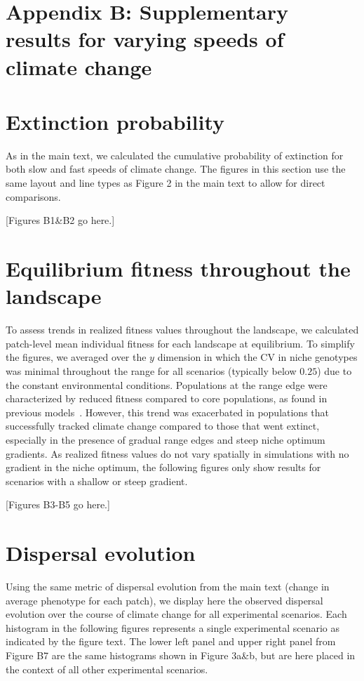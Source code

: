 \documentclass[11pt]{article}
\begin{document}
\section*{Appendix B: Supplementary results for varying speeds of climate change}

\renewcommand{\theequation}{B\arabic{equation}}
\renewcommand{\thetable}{B\arabic{table}}
\setcounter{equation}{0}  %
\setcounter{figure}{0}
\setcounter{table}{0}

\section*{Extinction probability}
As in the main text, we calculated the cumulative probability of extinction for both slow and fast speeds of climate change. The figures in this section use the same layout and line types as Figure 2 in the main text to allow for direct comparisons.

[Figures B1\&B2 go here.]

\section*{Equilibrium fitness throughout the landscape}
To assess trends in realized fitness values throughout the landscape, we calculated patch-level mean individual fitness for each landscape at equilibrium. To simplify the figures, we averaged over the $y$ dimension in which the CV in niche genotypes was minimal throughout the range for all scenarios (typically below $0.25$) due to the constant environmental conditions. Populations at the range edge were characterized by reduced fitness compared to core populations, as found in previous models~\citep{garcia1997genetic}. However, this trend was exacerbated in populations that successfully tracked climate change compared to those that went extinct, especially in the presence of gradual range edges and steep niche optimum gradients. As realized fitness values do not vary spatially in simulations with no gradient in the niche optimum, the following figures only show results for scenarios with a shallow or steep gradient.

[Figures B3-B5 go here.]

\section*{Dispersal evolution}
Using the same metric of dispersal evolution from the main text (change in average phenotype for each patch), we display here the observed dispersal evolution over the course of climate change for all experimental scenarios. Each histogram in the following figures represents a single experimental scenario as indicated by the figure text. The lower left panel and upper right panel from Figure B7 are the same histograms shown in Figure 3a\&b, but are here placed in the context of all other experimental scenarios.
\end{document}
